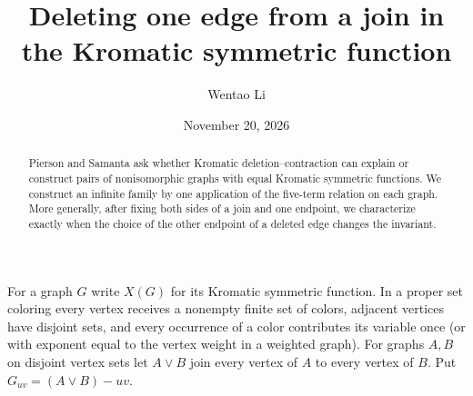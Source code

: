 \documentclass[11pt]{article}
\title{Deleting one edge from a join in the Kromatic symmetric function}
\author{Wentao Li}
\date{November 20, 2026}
\begin{document}
\maketitle
\begin{abstract}
Pierson and Samanta ask whether Kromatic deletion--contraction can explain or
construct pairs of nonisomorphic graphs with equal Kromatic symmetric functions.
We construct an infinite family by one application of the five-term relation
on each graph. More generally, after fixing both sides of a join and one endpoint,
we characterize exactly when the choice of the other endpoint of a deleted edge
changes the invariant.
\end{abstract}
For a graph $G$ write $X(G)$ for its Kromatic symmetric function. In a proper
set coloring every vertex receives a nonempty finite set of colors, adjacent
vertices have disjoint sets, and every occurrence of a color contributes its
variable once (or with exponent equal to the vertex weight in a weighted graph).
For graphs $A,B$ on disjoint vertex sets let $A\vee B$ join every vertex of $A$
to every vertex of $B$. Put $G_{uv}=(A\vee B)-uv$.
\end{document}
